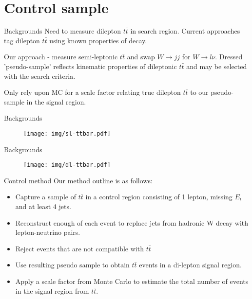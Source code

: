 \documentclass{beamer}
\begin{document}
\section{Control sample}

\begin{frame}{Backgrounds}
Need to measure dilepton $t\bar{t}$ in search region. Current approaches tag dilepton $t\bar{t}$ using known properties of decay.

Our approach - measure semi-leptonic $t\bar{t}$ and swap $W\rightarrow jj$ for $W\rightarrow l\nu$. Dressed 'pseudo-sample' reflects kinematic properties of dileptonic $t\bar{t}$ and may be selected with the search criteria.

Only rely upon MC for a scale factor relating true dilepton $t\bar{t}$ to our pseudo-sample in the signal region.
\end{frame}

\begin{frame}{Backgrounds}
  \begin{figure}
    \centering
    \texttt{[image: img/sl-ttbar.pdf]}
  \end{figure}
\end{frame}

\begin{frame}{Backgrounds}
  \begin{figure}
    \centering
    \texttt{[image: img/dl-ttbar.pdf]}
  \end{figure}
\end{frame}

\begin{frame}{Control method}
Our method outline is as follows:
  \begin{itemize}
    \item Capture a sample of $t \bar{t}$ in a control region consisting of 1 lepton, missing $E_{t}$ and at least 4 jets.
    \item Reconstruct enough of each event to replace jets from hadronic W decay with lepton-neutrino pairs.
    \item Reject events that are not compatible with $t \bar{t}$
    \item Use resulting pseudo sample to obtain $t \bar{t}$ events in a di-lepton signal region.
    \item Apply a scale factor from Monte Carlo to estimate the total number of events in the signal region from $t \bar{t}$.
  \end{itemize}
\end{frame}
\end{document}
